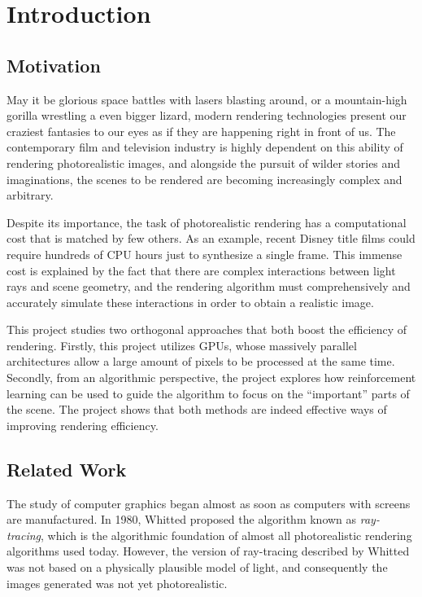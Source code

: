 \chapter{Introduction}

\section{Motivation}
May it be glorious space battles with lasers blasting around, or a mountain-high gorilla wrestling a even bigger lizard, modern rendering technologies present our craziest fantasies to our eyes as if they are happening right in front of us. The contemporary film and television industry is highly dependent on this ability of rendering photorealistic images, and alongside the pursuit of wilder stories and imaginations, the scenes to be rendered are becoming increasingly complex and arbitrary.

Despite its importance, the task of photorealistic rendering has a computational cost that is matched by few others. As an example, recent Disney title films could require hundreds of CPU hours just to synthesize a single frame\cite{hyperion}. This immense cost is explained by the fact that there are complex interactions between light rays and scene geometry, and the rendering algorithm must comprehensively and accurately simulate these interactions in order to obtain a realistic image. 

This project studies two orthogonal approaches that both boost the efficiency of rendering. Firstly, this project utilizes GPUs, whose massively parallel architectures allow a large amount of pixels to be processed at the same time. Secondly, from an algorithmic perspective, the project explores how reinforcement learning can be used to guide the algorithm to focus on the ``important'' parts of the scene. The project shows that both methods are indeed effective ways of improving rendering efficiency.

\section{Related Work}

The study of computer graphics began almost as soon as computers with screens are manufactured. In 1980, Whitted\cite{whitted} proposed the algorithm known as \textit{ray-tracing}, which is the algorithmic foundation of almost all photorealistic rendering algorithms used today. However, the version of ray-tracing described by Whitted was not based on a physically plausible model of light, and consequently the images generated was not yet photorealistic. 


